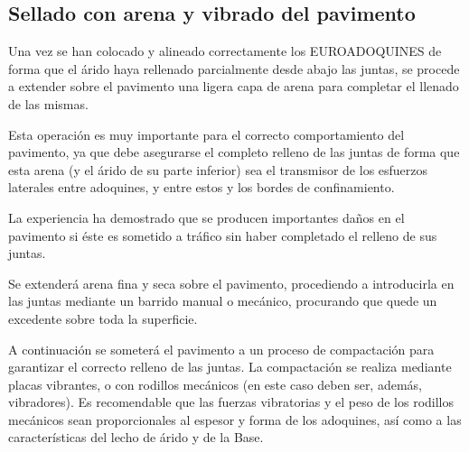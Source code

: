 \subsection{Sellado con arena y vibrado del pavimento}


Una vez se han colocado y alineado correctamente los EUROADOQUINES de forma que el árido haya rellenado parcialmente desde abajo las juntas, se procede a extender sobre el pavimento una ligera capa de arena para completar el llenado de las mismas.

Esta operación es muy importante para el correcto comportamiento del pavimento, ya que debe asegurarse el completo relleno de las juntas de forma que esta arena (y el árido de su parte inferior) sea el transmisor de los esfuerzos laterales entre adoquines, y entre estos y los bordes de confinamiento.

La experiencia ha demostrado que se producen importantes daños en el pavimento si éste es sometido a tráfico sin haber completado el relleno de sus juntas.

Se extenderá arena fina y seca sobre el pavimento, procediendo a introducirla en las juntas mediante un barrido manual o mecánico, procurando que quede un excedente sobre toda la superficie.

A continuación se someterá el pavimento a un proceso de compactación para garantizar el correcto relleno de las juntas.
La compactación se realiza mediante placas vibrantes, o con rodillos mecánicos (en este caso deben ser, además, vibradores).
Es recomendable que las fuerzas vibratorias y el peso de los rodillos mecánicos sean proporcionales al espesor y forma de los adoquines, así como a las características del lecho de árido y de la Base.
